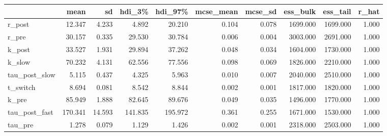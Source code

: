\begin{tabular}{lrrrrrrrrr}
\toprule
 & mean & sd & hdi\_3\% & hdi\_97\% & mcse\_mean & mcse\_sd & ess\_bulk & ess\_tail & r\_hat \\
\midrule
r\_post & 12.347 & 4.233 & 4.892 & 20.210 & 0.104 & 0.078 & 1699.000 & 1699.000 & 1.000 \\
r\_pre & 30.157 & 0.335 & 29.530 & 30.784 & 0.006 & 0.004 & 3003.000 & 2691.000 & 1.000 \\
k\_post & 33.527 & 1.931 & 29.894 & 37.262 & 0.048 & 0.034 & 1604.000 & 1730.000 & 1.000 \\
k\_slow & 70.232 & 4.131 & 62.556 & 77.556 & 0.098 & 0.069 & 1826.000 & 2210.000 & 1.000 \\
tau\_post\_slow & 5.115 & 0.437 & 4.325 & 5.963 & 0.010 & 0.007 & 2040.000 & 2510.000 & 1.000 \\
t\_switch & 8.694 & 0.081 & 8.542 & 8.844 & 0.002 & 0.001 & 1817.000 & 1820.000 & 1.000 \\
k\_pre & 85.949 & 1.888 & 82.645 & 89.676 & 0.049 & 0.035 & 1496.000 & 1770.000 & 1.000 \\
tau\_post\_fast & 170.341 & 14.593 & 141.835 & 195.972 & 0.361 & 0.255 & 1671.000 & 1530.000 & 1.000 \\
tau\_pre & 1.278 & 0.079 & 1.129 & 1.426 & 0.002 & 0.001 & 2318.000 & 2503.000 & 1.000 \\
\bottomrule
\end{tabular}
